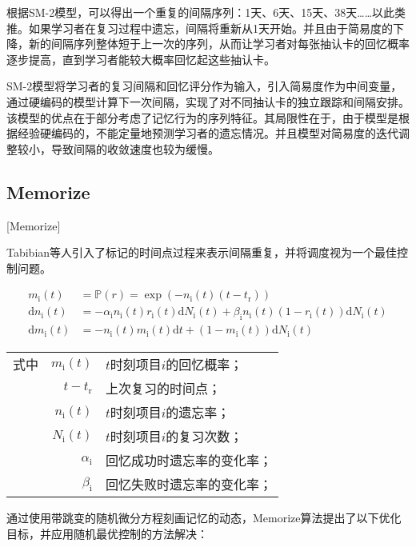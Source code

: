 根据SM-2模型，可以得出一个重复的间隔序列：1天、6天、15天、38天……以此类推。如果学习者在复习过程中遗忘，间隔将重新从1天开始。并且由于简易度的下降，新的间隔序列整体短于上一次的序列，从而让学习者对每张抽认卡的回忆概率逐步提高，直到学习者能较大概率回忆起这些抽认卡。

SM-2模型将学习者的复习间隔和回忆评分作为输入，引入简易度作为中间变量，通过硬编码的模型计算下一次间隔，实现了对不同抽认卡的独立跟踪和间隔安排。该模型的优点在于部分考虑了记忆行为的序列特征。其局限性在于，由于模型是根据经验硬编码的，不能定量地预测学习者的遗忘情况。并且模型对简易度的迭代调整较小，导致间隔的收敛速度也较为缓慢。

\subsection{Memorize}[Memorize]

Tabibian等人\cite{tabibianEnhancingHumanLearning2019}引入了标记的时间点过程来表示间隔重复，并将调度视为一个最佳控制问题。

\begin{equation}
\begin{align}
    m_\mathrm{i}(t)&=\mathbb{P}(r)=\exp (-n_\mathrm{i}(t)(t-t_\mathrm{r}))\\
    \mathrm{d} n_\mathrm{i}(t)&=-\alpha_\mathrm{i} n_\mathrm{i}(t) r_\mathrm{i}(t) \mathrm{d} N_\mathrm{i}(t)+\beta_\mathrm{i} n_\mathrm{i}(t)(1-r_\mathrm{i}(t)) \mathrm{d} N_\mathrm{i}(t)\\
    \mathrm{d} m_\mathrm{i}(t)&=-n_\mathrm{i}(t) m_\mathrm{i}(t) \mathrm{d} t+(1-m_\mathrm{i}(t)) \mathrm{d} N_\mathrm{i}(t)
\end{align}
\end{equation}
\begin{tabularx}{\textwidth}{@{}l@{\quad}r@{———}X@{}}
    式中& $m_\mathrm{i}(t)$ &$t$时刻项目$i$的回忆概率；\\
    & $t-t_\mathrm{r}$ &上次复习的时间点；\\
    & $n_\mathrm{i}(t)$ &$t$时刻项目$i$的遗忘率；\\
    & $N_\mathrm{i}(t)$ &$t$时刻项目$i$的复习次数；\\
    & $\alpha_\mathrm{i}$ &回忆成功时遗忘率的变化率；\\
    & $\beta_\mathrm{i}$ &回忆失败时遗忘率的变化率；\\
\end{tabularx}\vspace{3.15bp}

通过使用带跳变的随机微分方程刻画记忆的动态，Memorize算法提出了以下优化目标，并应用随机最优控制的方法解决：

